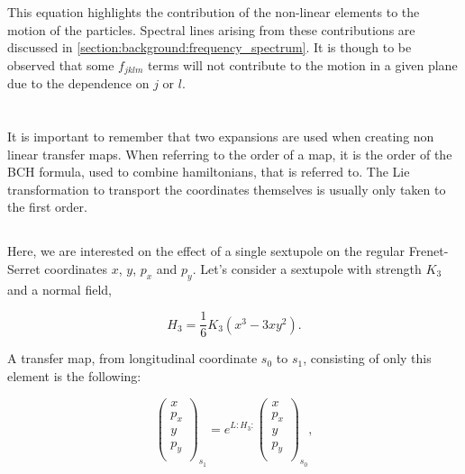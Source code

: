 This equation highlights the contribution of the non-linear elements to the motion of the particles.
Spectral lines arising from these contributions are discussed in
\cref{section:background:frequency_spectrum}.
It is though to be observed that some $f_{jklm}$ terms will not contribute to the motion in a given
plane due to the dependence on $j$ or $l$.



\section{}
\label{subsection:coordinate_systems:example_of_maps}

It is important to remember that two expansions are used when creating non linear transfer maps.
When referring to the order of a map, it is the order of the BCH formula, used to combine
hamiltonians, that is referred to.
The Lie transformation to transport the coordinates themselves is usually only taken to the first
order.

\subsection{}

Here, we are interested on the effect of a single sextupole on the regular Frenet-Serret coordinates
$x$, $y$, $p_x$ and $p_y$.
Let's consider a sextupole with strength $K_3$ and a normal field,

\begin{equation}
    H_3 = \frac{1}{6} K_3 (x^3 - 3xy^2).
\end{equation}

A transfer map, from longitudinal coordinate $s_0$ to $s_1$, consisting of only this element is the
following:

\begin{equation}
    \begin{pmatrix}
        x \\
        p_x \\
        y \\
        p_y \\
    \end{pmatrix}_{s_1}
    =
    e^{L:H_3:}
    \begin{pmatrix}
        x \\
        p_x \\
        y \\
        p_y \\
    \end{pmatrix}_{s_0},
    \label{eq:coordinate_systems:single_sextupole_lie_transfer}
\end{equation}

